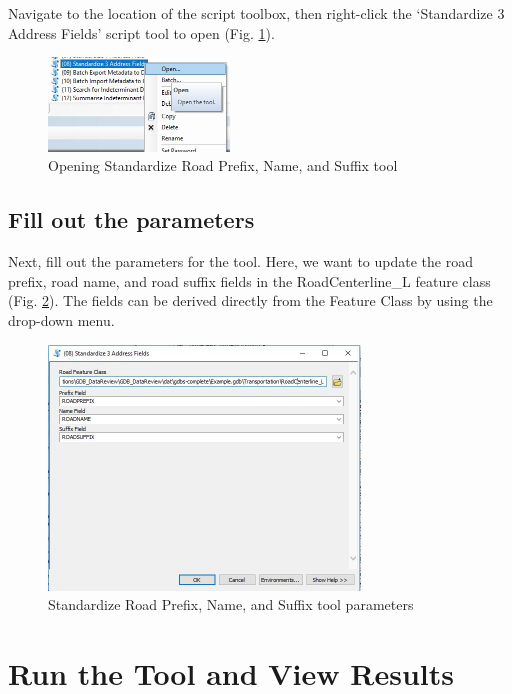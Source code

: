 \documentclass[openany]{book}
\theoremstyle{definition}
\theoremstyle{definition}
\theoremstyle{definition}
\theoremstyle{remark}
\begin{document}
Navigate to the location of the script toolbox, then right-click the
`Standardize 3 Address Fields' script tool to open (Fig.
\ref{fig:std3open}).

\begin{figure}[H]

{\centering \includegraphics[width=1.9in,]{figures/std3-open} 

}

\caption{Opening Standardize Road Prefix, Name, and Suffix tool}\label{fig:std3open}
\end{figure}

\subsection{Fill out the parameters}\label{fill-out-the-parameters-7}

Next, fill out the parameters for the tool. Here, we want to update the
road prefix, road name, and road suffix fields in the RoadCenterline\_L
feature class (Fig. \ref{fig:std3params}). The fields can be derived
directly from the Feature Class by using the drop-down menu.

\begin{figure}[H]

{\centering \includegraphics[width=3.26in,]{figures/std3-toolparams} 

}

\caption{Standardize Road Prefix, Name, and Suffix tool parameters}\label{fig:std3params}
\end{figure}

\section{Run the Tool and View
Results}\label{run-the-tool-and-view-results-7}
\end{document}
